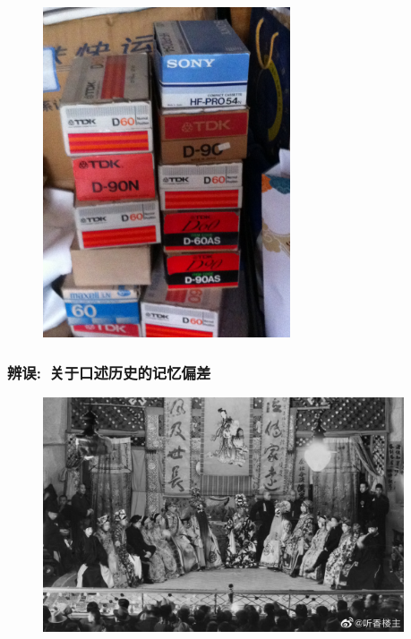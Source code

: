 \documentclass[cjk,slidestop,compress,mathserif,blue]{beamer}
\begin{document}
\frame
{
	\frametitle{}
\begin{figure}[h!]
\centering
\vspace{-0.15in}
\includegraphics[height=0.45\textwidth,width=0.65\textwidth,angle=270, clip]{Figures_Peking-Opera/PekOpe_Wu-5.jpg}
\label{Wu_xiaoru-4}
\end{figure}
}

\frame
{
	\frametitle{辨误:~关于口述历史的记忆偏差}
\begin{figure}[h!]
\centering
\vspace{-0.10in}
\includegraphics[height=0.65\textwidth,width=0.95\textwidth, clip]{Figures_Peking-Opera/PekOpe_His-7.jpg}
\label{History-7}
\end{figure}
}
\end{document}
